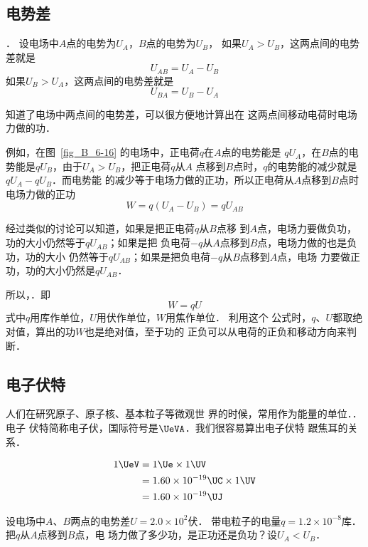 \subsection{电势差}
．
设电场中$A$点的电势为$U_A$，$B$点的电势为$U_B$，
如果$U_A>U_B$，这两点间的电势差就是
\[U_{AB}=U_A-U_B \]
如果$U_B>U_A$，这两点间的电势差就是
\[U_{BA}=U_B-U_A \]

知道了电场中两点间的电势差，可以很方便地计算出在
这两点间移动电荷时电场力做的功．

例如，在图~\ref{fig_B_6-16} 的电场中，正电荷$q$在$A$点的电势能是
$qU_A$，在$B$点的电势能是$qU_B$，由于$U_A>U_B$，把正电荷$q$从$A$
点移到$B$点时，$q$的电势能的减少就是$qU_A-qU_B$．而电势能
的减少等于电场力做的正功，所以正电荷从$A$点移到$B$点时
电场力做的正功
\[W=q(U_A-U_B)=qU_{AB}\]

经过类似的讨论可以知道，如果是把正电荷$q$从$B$点移
到$A$点，电场力要做负功，功的大小仍然等于$qU_{AB}$；如果是把
负电荷$-q$从$A$点移到$B$点，电场力做的也是负功，功的大小
仍然等于$qU_{AB}$；如果是把负电荷$-q$从$B$点移到$A$点，电场
力要做正功，功的大小仍然是$qU_{AB}$．

所以，．即
\[W=qU\]
式中$q$用库作单位，$U$用伏作单位，$W$用焦作单位．
利用这个
公式时，$q$、$U$都取绝对值，算出的功$W$也是绝对值，至于功的
正负可以从电荷的正负和移动方向来判断．

\subsection{电子伏特}


人们在研究原子、原子核、基本粒子等微观世
界的时候，常用作为能量的单位．．
电子
伏特简称电子伏，国际符号是$\UeVA$．我们很容易算出电子伏特
跟焦耳的关系．

\[\begin{split}
    1 \UeV &=1 \Ue \times 1 \UV \\
    &=1.60\times 10^{-19} \UC \times 1 \UV\\
&=1.60\times 10^{-19} \UJ 
\end{split}    \]


\begin{example}
    设电场中$A$、$B$两点的电势差$U=2.0\times10^2$伏．
    带电粒子的电量$q=1.2\times10^{-8}$库．
    把$q$从$A$点移到$B$点，电
    场力做了多少功，是正功还是负功？设$U_A<U_B$．
\end{example}

